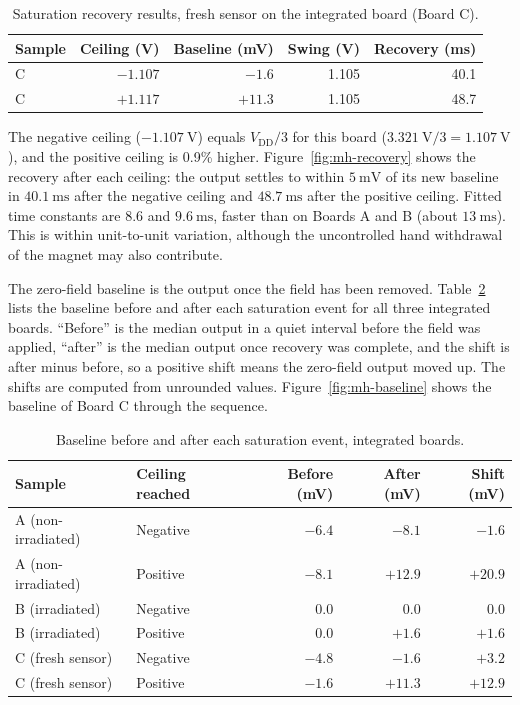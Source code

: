 \documentclass[12pt,a4paper]{article}
\begin{document}
\begin{table}[H]
\centering
\caption{Saturation recovery results, fresh sensor on the integrated board (Board C).}
\label{tab:mh-saturation}
\begin{tabular}{@{}lrrrr@{}}
\toprule
Sample & Ceiling (V) & Baseline (mV) & Swing (V) & Recovery (ms) \\
\midrule
C & $-1.107$ & $-1.6$ & 1.105 & 40.1 \\
C & $+1.117$ & $+11.3$ & 1.105 & 48.7 \\
\bottomrule
\end{tabular}
\end{table}

The negative ceiling ($-\SI{1.107}{\volt}$) equals $V_{\text{DD}}/3$ for this board ($\SI{3.321}{\volt}/3 = \SI{1.107}{\volt}$), and the positive ceiling is 0.9\% higher. Figure~\ref{fig:mh-recovery} shows the recovery after each ceiling: the output settles to within $\SI{5}{\milli\volt}$ of its new baseline in $\SI{40.1}{\milli\second}$ after the negative ceiling and $\SI{48.7}{\milli\second}$ after the positive ceiling. Fitted time constants are 8.6 and $\SI{9.6}{\milli\second}$, faster than on Boards A and B (about $\SI{13}{\milli\second}$). This is within unit-to-unit variation, although the uncontrolled hand withdrawal of the magnet may also contribute.

The zero-field baseline is the output once the field has been removed. Table~\ref{tab:baseline-shift} lists the baseline before and after each saturation event for all three integrated boards. ``Before'' is the median output in a quiet interval before the field was applied, ``after'' is the median output once recovery was complete, and the shift is after minus before, so a positive shift means the zero-field output moved up. The shifts are computed from unrounded values. Figure~\ref{fig:mh-baseline} shows the baseline of Board C through the sequence.

\begin{table}[H]
\centering
\caption{Baseline before and after each saturation event, integrated boards.}
\label{tab:baseline-shift}
\begin{tabular}{@{}llrrr@{}}
\toprule
Sample & Ceiling reached & Before (mV) & After (mV) & Shift (mV) \\
\midrule
A (non-irradiated) & Negative & $-6.4$ & $-8.1$ & $-1.6$ \\
A (non-irradiated) & Positive & $-8.1$ & $+12.9$ & $+20.9$ \\
B (irradiated) & Negative & $0.0$ & $0.0$ & $0.0$ \\
B (irradiated) & Positive & $0.0$ & $+1.6$ & $+1.6$ \\
C (fresh sensor) & Negative & $-4.8$ & $-1.6$ & $+3.2$ \\
C (fresh sensor) & Positive & $-1.6$ & $+11.3$ & $+12.9$ \\
\bottomrule
\end{tabular}
\end{table}
\end{document}

